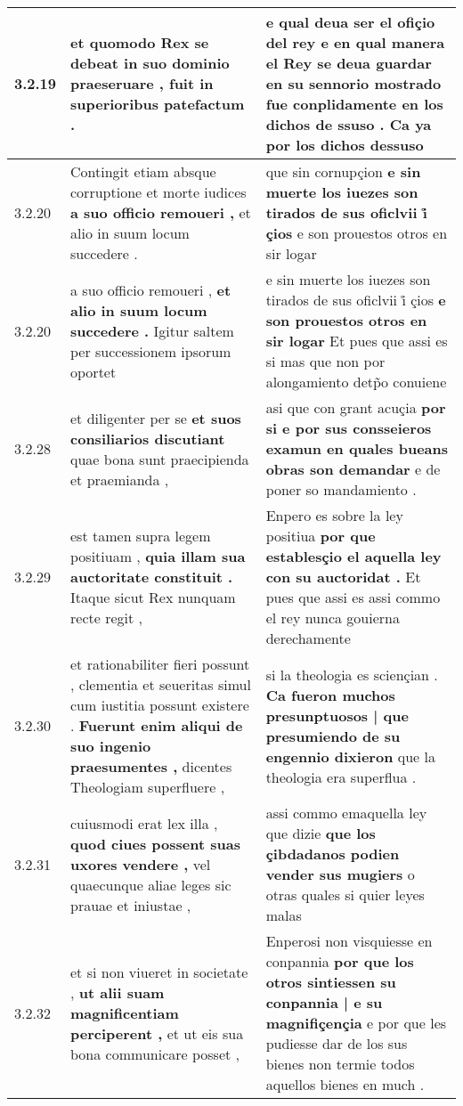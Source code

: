 \begin{tabular}{|p{1cm}|p{6.5cm}|p{6.5cm}|}
3.2.19 & et quomodo Rex se debeat \textbf{ in suo dominio praeseruare , } fuit in superioribus patefactum . & e qual deua ser el ofiçio del rey \textbf{ e en qual manera el Rey se deua guardar en su sennorio mostrado fue conplidamente en los dichos de ssuso . } Ca ya por los dichos dessuso \\\hline
3.2.20 & Contingit etiam absque corruptione et morte iudices \textbf{ a suo officio remoueri , } et alio in suum locum succedere . & que sin cornupçion \textbf{ e sin muerte los iuezes son tirados de sus oficlvii i̊ çios } e son prouestos otros en sir logar \\\hline
3.2.20 & a suo officio remoueri , \textbf{ et alio in suum locum succedere . } Igitur saltem per successionem ipsorum oportet & e sin muerte los iuezes son tirados de sus oficlvii i̊ çios \textbf{ e son prouestos otros en sir logar } Et pues que assi es si mas que non por alongamiento detp̃o conuiene \\\hline
3.2.28 & et diligenter per se \textbf{ et suos consiliarios discutiant } quae bona sunt praecipienda et praemianda , & asi que con grant acuçia \textbf{ por si e por sus consseieros examun en quales bueans obras son demandar } e de poner so mandamiento . \\\hline
3.2.29 & est tamen supra legem positiuam , \textbf{ quia illam sua auctoritate constituit . } Itaque sicut Rex nunquam recte regit , & Enpero es sobre la ley positiua \textbf{ por que establesçio el aquella ley con su auctoridat . } Et pues que assi es assi commo el rey nunca gouierna derechamente \\\hline
3.2.30 & et rationabiliter fieri possunt , clementia et seueritas simul cum iustitia possunt existere . \textbf{ Fuerunt enim aliqui de suo ingenio praesumentes , } dicentes Theologiam superfluere , & si la theologia es sciençian . \textbf{ Ca fueron muchos presunptuosos | que presumiendo de su engennio dixieron } que la theologia era superflua . \\\hline
3.2.31 & cuiusmodi erat lex illa , \textbf{ quod ciues possent suas uxores vendere , } vel quaecunque aliae leges sic prauae et iniustae , & assi commo emaquella ley que dizie \textbf{ que los çibdadanos podien vender sus mugiers } o otras quales si quier leyes malas \\\hline
3.2.32 & et si non viueret in societate , \textbf{ ut alii suam magnificentiam perciperent , } et ut eis sua bona communicare posset , & Enperosi non visquiesse en conpannia \textbf{ por que los otros sintiessen su conpannia | e su magnifiçençia } e por que les pudiesse dar de los sus bienes non termie todos aquellos bienes en much . \\\hline

\end{tabular}
